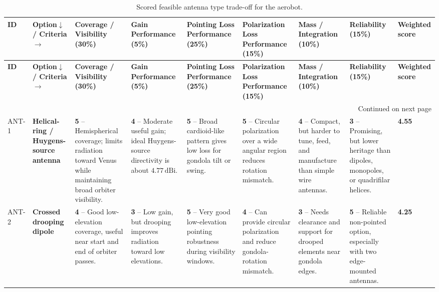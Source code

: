 \begin{longtable}{|p{}|p{}|p{}|p{}|p{}|p{}|p{}|p{}|p{}|}
\caption{Scored feasible antenna type trade-off for the aerobot.}
\label{tab:antenna_tradeoff} \\
\hline
\textbf{ID} &
\textbf{Option$\downarrow$ / Criteria$\rightarrow$} &
\textbf{Coverage / Visibility (30\%)} &
\textbf{Gain Performance (5\%)} &
\textbf{Pointing Loss Performance (25\%)} &
\textbf{Polarization Loss Performance (15\%)} &
\textbf{Mass / Integration (10\%)} &
\textbf{Reliability (15\%)} &
\textbf{Weighted score} \\
\hline
\endfirsthead

\hline
\textbf{ID} &
\textbf{Option$\downarrow$ / Criteria$\rightarrow$} &
\textbf{Coverage / Visibility (30\%)} &
\textbf{Gain Performance (5\%)} &
\textbf{Pointing Loss Performance (25\%)} &
\textbf{Polarization Loss Performance (15\%)} &
\textbf{Mass / Integration (10\%)} &
\textbf{Reliability (15\%)} &
\textbf{Weighted score} \\
\hline
\endhead

\hline
\multicolumn{9}{r}{\small Continued on next page} \\
\endfoot

\hline
\endlastfoot

ANT-1 &
\textbf{Helical-ring / Huygens-source antenna\cite{morlaas2015helical}} &
\cellcolor{score5!40}\textbf{5} -- Hemispherical coverage; limits radiation toward Venus while maintaining broad orbiter visibility. &
\cellcolor{score4!40}\textbf{4} -- Moderate useful gain; ideal Huygens-source directivity is about $4.77\,\mathrm{dBi}$. &
\cellcolor{score5!40}\textbf{5} -- Broad cardioid-like pattern gives low loss for gondola tilt or swing. &
\cellcolor{score5!40}\textbf{5} -- Circular polarization over a wide angular region reduces rotation mismatch. &
\cellcolor{score4!40}\textbf{4} -- Compact, but harder to tune, feed, and manufacture than simple wire antennas. &
\cellcolor{score3!40}\textbf{3} -- Promising, but lower heritage than dipoles, monopoles, or quadrifilar helices. &
\cellcolor{score5!40}\textbf{4.55} \\
\hline

ANT-2 &
\textbf{Crossed drooping dipole} &
\cellcolor{score4!40}\textbf{4} -- Good low-elevation coverage, useful near start and end of orbiter passes. &
\cellcolor{score3!40}\textbf{3} -- Low gain, but drooping improves radiation toward low elevations. &
\cellcolor{score5!40}\textbf{5} -- Very good low-elevation pointing robustness during visibility windows. &
\cellcolor{score4!40}\textbf{4} -- Can provide circular polarization and reduce gondola-rotation mismatch. &
\cellcolor{score3!40}\textbf{3} -- Needs clearance and support for drooped elements near gondola edges. &
\cellcolor{score5!40}\textbf{5} -- Reliable non-pointed option, especially with two edge-mounted antennas. &
\cellcolor{score4!40}\textbf{4.25} \\
\hline


\end{longtable}
